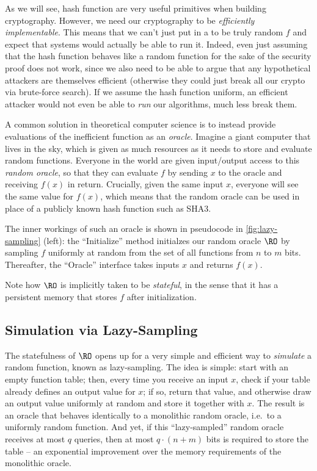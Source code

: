     As we will see, hash function are very useful primitives when building
      cryptography. However, we need our cryptography to be
      \emph{efficiently implementable}. This means that we can't just
      put in a to be truly random $f$ and expect that systems would actually be
      able to run it. Indeed, even just assuming that the hash function behaves
      like a random function for the sake of the security proof does not work,
      since we also need to be able to argue that any hypothetical attackers 
      are themselves efficient (otherwise they could just break all our crypto via
      brute-force search).
      If we assume the hash function uniform, an efficient attacker would not even be able to
      \emph{run} our algorithms, much less break them.

    A common solution in theoretical computer science is to instead provide
      evaluations of the inefficient function as an \emph{oracle}. Imagine a giant computer
      that lives in the sky, which is given as much resources as it needs to store
      and evaluate random functions. Everyone in the world are given
      input/output access to this \emph{random oracle}, so that they can evaluate $f$ by sending
      $x$ to the oracle and receiving $f(x)$ in return.
      Crucially, given the same input $x$, everyone will see the same value for
      $f(x)$, which means that the random oracle can be used in place of 
      a publicly known hash function such as SHA3.

    The inner workings of such an oracle is shown in pseudocode in
      \cref{fig:lazy-sampling} (left): the
      ``Initialize'' method initialzes our random oracle $\RO$ by sampling $f$
      uniformly at random from the set of all functions from $n$ to $m$ bits.
      Thereafter, the ``Oracle'' interface takes inputs $x$ and returns $f(x)$.

    Note how $\RO$ is implicitly taken to be \emph{stateful}, in the sense
      that it has a persistent memory that stores $f$ after initialization.

  \subsection{Simulation via Lazy-Sampling}\label{sec:lazy-sampling}
    The statefulness of $\RO$ opens up for a very simple and efficient way to
      \emph{simulate} a random function, known as lazy-sampling. The idea is
      simple: start with an empty function table; then, every time you receive an input $x$, check if
      your table already defines an output value for $x$; 
      if so, return that value, and otherwise draw an output
      value uniformly at random and store it together with $x$. The result is an
      oracle that behaves identically to a monolithic random oracle, i.e.\ to a
      uniformly random function. And yet, if this ``lazy-sampled'' random oracle
      receives at most $q$ queries, then at most $q \cdot (n+m)$ bits is required to
      store the table -- an exponential improvement over the memory requirements
      of the monolithic oracle.

